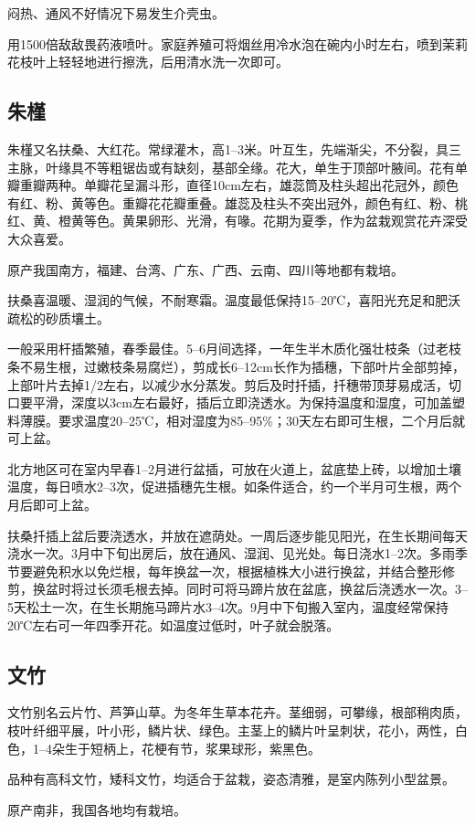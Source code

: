 \documentclass{ctexbook}
\begin{document}
闷热、通风不好情况下易发生介壳虫。

用1500倍敌敌畏药液喷叶。家庭养殖可将烟丝用冷水泡在碗内小时左右，喷到茉莉花枝叶上轻轻地进行擦洗，后用清水洗一次即可。
\subsection{朱槿}
朱槿又名扶桑、大红花。常绿灌木，高1--3米。叶互生，先端渐尖，不分裂，具三主脉，叶缘具不等粗锯齿或有缺刻，基部全缘。花大，单生于顶部叶腋间。花有单瓣重瓣两种。单瓣花呈漏斗形，直径10cm左右，雄蕊筒及柱头超出花冠外，颜色有红、粉、黄等色。重瓣花花瓣重叠。雄蕊及柱头不突出冠外，颜色有红、粉、桃红、黄、橙黄等色。黄果卵形、光滑，有喙。花期为夏季，作为盆栽观赏花卉深受大众喜爱。

原产我国南方，福建、台湾、广东、广西、云南、四川等地都有栽培。

扶桑喜温暖、湿润的气候，不耐寒霜。温度最低保持15--20℃，喜阳光充足和肥沃疏松的砂质壤土。

一般采用杆插繁殖，春季最佳。5--6月间选择，一年生半木质化强壮枝条（过老枝条不易生根，过嫩枝条易腐烂），剪成长6--12cm长作为插穗，下部叶片全部剪掉，上部叶片去掉1/2左右，以减少水分蒸发。剪后及时扦插，扦穗带顶芽易成活，切口要平滑，深度以3cm左右最好，插后立即浇透水。为保持温度和湿度，可加盖塑料薄膜。要求温度20--25℃，相对湿度为85--95\%；30天左右即可生根，二个月后就可上盆。

北方地区可在室内早春1--2月进行盆插，可放在火道上，盆底垫上砖，以增加土壤温度，每日喷水2--3次，促进插穗先生根。如条件适合，约一个半月可生根，两个月后即可上盆。

扶桑扦插上盆后要浇透水，并放在遮荫处。一周后逐步能见阳光，在生长期间每天浇水一次。3月中下旬出房后，放在通风、湿润、见光处。每日浇水1--2次。多雨季节要避免积水以免烂根，每年换盆一次，根据植株大小进行换盆，并结合整形修剪，换盆时将过长须毛根去掉。同时可将马蹄片放在盆底，换盆后浇透水一次。3--5天松土一次，在生长期施马蹄片水3--4次。9月中下旬搬入室内，温度经常保持20℃左右可一年四季开花。如温度过低时，叶子就会脱落。
\subsection{文竹}
文竹别名云片竹、芦笋山草。为冬年生草本花卉。茎细弱，可攀缘，根部稍肉质，枝叶纤细平展，叶小形，鳞片状、绿色。主茎上的鳞片叶呈刺状，花小，两性，白色，1--4朵生于短柄上，花梗有节，浆果球形，紫黑色。

品种有高科文竹，矮科文竹，均适合于盆栽，姿态清雅，是室内陈列小型盆景。

原产南非，我国各地均有栽培。
\end{document}
